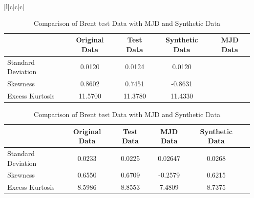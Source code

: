 \documentclass[12pt]{article}
\numberwithin{equation}{section}
\begin{document}
\begin{table}[h!]
\centering
\begin{tabular}{|l|c|c|c|}
\hline
\begin{table}[h!]
\centering
\begin{tabular}{lcccc}
\hline
\textbf{} & \textbf{Original Data}& \textbf{Test Data} & \textbf{Synthetic Data} & \textbf{MJD Data} \\
\hline 
Standard Deviation  & 0.0120 & 0.0124 & 0.0120 \\
Skewness            & 0.8602 & 0.7451 & -0.8631 \\
Excess Kurtosis     & 11.5700 & 11.3780 & 11.4330 \\
\hline
\end{tabular}
\caption{Comparison of Statistical Moments: Original, Synthetic, and MJD Data}
\label{tab:comparison_moments}
\end{table}
\begin{table}[h!]
\centering
\begin{tabular}{lccccc}
\hline
\textbf{} & \textbf{Original Data} & \textbf{Test Data} & \textbf{MJD Data} & \textbf{Synthetic Data} \\
\hline 
Standard Deviation & 0.0233 &0.0225 & 0.02647 & 0.0268   \\
Skewness            & 0.6550 &0.6709 & -0.2579 & 0.6215 \\
Excess Kurtosis     & 8.5986 &8.8553 & 7.4809 & 8.7375  \\
\hline
\end{tabular}
\caption{Comparison of Brent test Data with MJD and Synthetic Data}
\label{tab:data}
\end{table}


\end{tabular}
\end{table}
\end{document}
